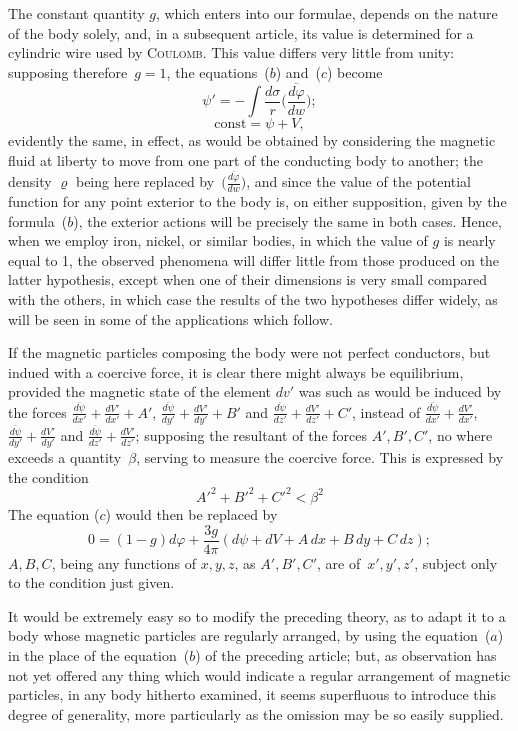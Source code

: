 \documentclass[12pt,notitlepage]{amsart}
\let\Person\textsc
\renewcommand{\rho}{\varrho}
\renewcommand{\phi}{\varphi}
\begin{document}
The constant quantity $g$, which enters into our formulae, depends on
the nature of the body solely, and, in a subsequent article, its value is 
determined for a cylindric wire used by \Person{Coulomb}.
This value differs very little
from unity: supposing therefore~${g=1}$,
the equations~($b$) and~($c$) become
\[
\tag{$b'$.}
\psi'=-\int\frac{d\sigma}{r}\biggl(\frac{\overline{d\phi}}{dw}\biggr);
\]
\[
\tag{$c'$.}
\text{const}=\psi+V,
\]
evidently the same, in effect, as would be obtained by considering the magnetic
fluid at liberty to move from one part of the conducting body to another;
the density $\rho$ being here replaced
by~$\bigl(\frac{\overline{d\phi}}{dw}\bigr)$,
and since the value of the
potential function for any point exterior to the body is, on either supposition,
given by the formula~($b$), the exterior actions will be precisely the same in
both cases. Hence, when we employ iron, nickel, or similar bodies, in which
the value of $g$ is nearly equal to 1, the observed phenomena will differ little
from those produced on the latter hypothesis, except when one of their 
dimensions is very small compared with the others, in which case the results
of the two hypotheses differ widely, as will be seen in some of the 
applications which follow.

If the magnetic particles composing the body were not perfect conductors,
but indued with a coercive force, it is clear there might always be
equilibrium, provided the magnetic state of the element $dv'$
was such as would be
induced by the forces
$\frac{\overline{d\psi}}{dx'}+\frac{dV'}{dx'}+A'$,
$\frac{\overline{d\psi}}{dy'}+\frac{dV'}{dy'}+B'$ and
$\frac{\overline{d\psi}}{dz'}+\frac{dV'}{dz'}+C'$,
instead of
$\frac{\overline{d\psi}}{dx'}+\frac{dV'}{dx'}$,
$\frac{\overline{d\psi}}{dy'}+\frac{dV'}{dy'}$ and
$\frac{\overline{d\psi}}{dz'}+\frac{dV'}{dz'}$;
supposing the resultant of
the forces $A',B',C'$, no where exceeds a quantity~$\beta$, serving to measure
the coercive force. This is expressed by the condition
\[
A'^2+B'^2+C'^2<\beta^2
\]
The equation ($c$) would then be replaced by
\[
0=(1-g)d\phi+\frac{3g}{4\pi}(d\psi+dV+A\,dx+B\,dy+C\,dz);
\]
$A,B,C$, being any functions of $x,y,z$, as $A',B',C'$, are of~$x',y',z'$,
subject only to the condition just given.

It would be extremely easy so to modify the preceding theory, as to
adapt it to a body whose magnetic particles are regularly arranged, by using
the equation~($a$) in the place of the equation~($b$) of the preceding article;
but, as observation has not yet offered any thing which would indicate a
regular arrangement of magnetic particles, in any body hitherto examined, it
seems superfluous to introduce this degree of generality, more particularly as
the omission may be so easily supplied.
\bigskip
\end{document}
